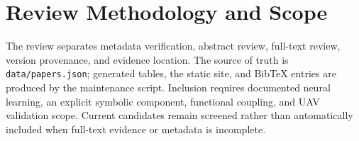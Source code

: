 \section{Review Methodology and Scope}

The review separates metadata verification, abstract review, full-text review,
version provenance, and evidence location. The source of truth is
\texttt{data/papers.json}; generated tables, the static site, and BibTeX
entries are produced by the maintenance script. Inclusion requires documented
neural learning, an explicit symbolic component, functional coupling, and UAV
validation scope. Current candidates remain screened rather than automatically
included when full-text evidence or metadata is incomplete.
